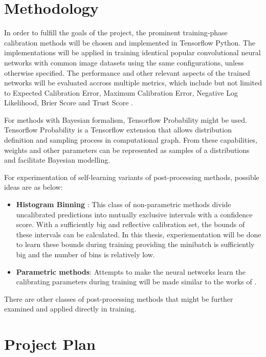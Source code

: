 \documentclass[a4paper]{article}
\begin{document}
\section{Methodology}

In order to fulfill the goals of the project, the prominent training-phase calibration methods will be chosen and implemented in Tensorflow Python. The implementations will be applied in training identical popular convolutional neural networks with common image datasets using the same configurations, unless otherwise specified. The performance and other relevant aspects of the trained networks will be evaluated accross multiple metrics, which include but not limited to Expected Calibration Error, Maximum Calibration Error, Negative Log Likelihood, Brier Score \cite{1950MWRv781B} and Trust Score \cite{NIPS2018_7798}.

For methods with Bayesian formalism, Tensorflow Probability might be used. Tensorflow Probability \cite{TensorProb} is a Tensorflow extension that allows distribution definition and sampling process in computational graph. From these capabilities, weights and other parameters can be represented as samples of a distributions and facilitate Bayesian modelling.

For experimentation of self-learning variants of post-processing methods, possible ideas are as below:
\begin{itemize}
	\item \textbf{Histogram Binning} \cite{Zadrozny:2001:OCP:645530.655658}: This class of non-parametric methods divide uncalibrated predictions into mutually exclusive intervals with a confidence score. With a sufficiently big and reflective calibration set, the bounds of these intervals can be calculated. In this thesis, experiementation will be done to learn these bounds during training providing the minibatch is sufficiently big and the number of bins is relatively low.
	\item \textbf{Parametric methods}: Attempts to make the neural networks learn the calibrating parameters during training will be made similar to the works of \cite{Neumann18c}.
\end{itemize}
There are other classes of post-processing methods that might be further examined and applied directly in training.

\color{black}

\section{Project Plan}
\end{document}
